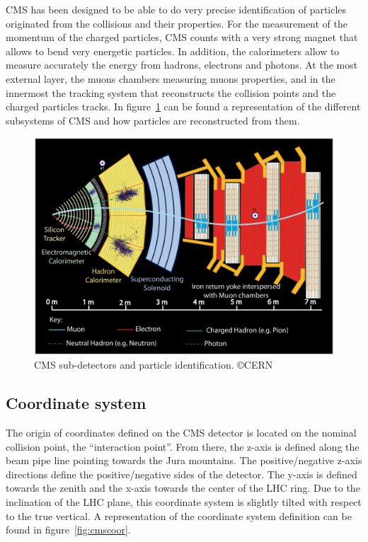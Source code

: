 CMS has been designed to be able to do very precise identification of particles originated from the collisions and their properties. For the measurement of the momentum of the charged particles, CMS counts with a very strong magnet that allows to bend very energetic particles. In addition, the calorimeters allow to measure accurately the energy from hadrons, electrons and photons. At the most external layer, the muons chambers measuring muons properties, and in the innermost the tracking system that reconstructs the collision points and the charged particles tracks. In figure~\ref{fig:cmsslice} can be found a representation of the different subsystems of CMS and how particles are reconstructed from them.

\begin{figure}[!Hhtbp]
  \begin{center}
    \includegraphics[width=\textwidth]{figs/PictureforPoint5_oct04_allp.jpg}
    \caption{CMS sub-detectors and particle identification. \copyright CERN}
    \label{fig:cmsslice}
  \end{center}
\end{figure}

\subsection{Coordinate system}
\label{sec:Csys}

The origin of coordinates defined on the CMS detector is located on the nominal collision point, the ``interaction point''. From there, the z-axis is defined along the beam pipe line pointing towards the Jura mountains. The positive/negative z-axis directions define the positive/negative sides of the detector. The y-axis is defined towards the zenith and the x-axis towards the center of the LHC ring. Due to the inclination of the LHC plane, this coordinate system is slightly tilted with respect to the true vertical. A representation of the coordinate system definition can be found in figure~\ref{fig:cmscoor}. 

